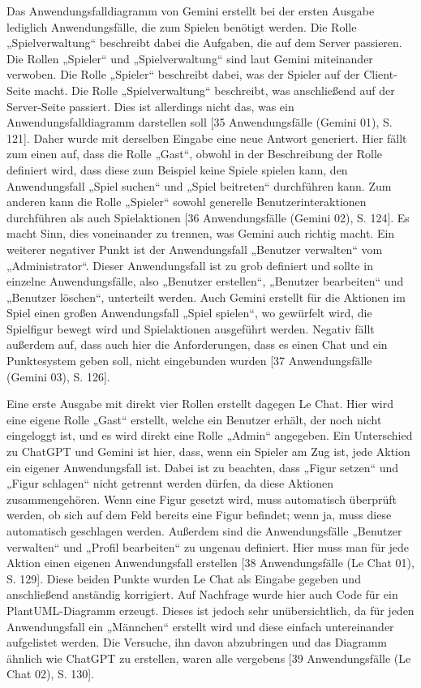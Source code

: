 Das Anwendungsfalldiagramm von Gemini erstellt bei der ersten Ausgabe lediglich Anwendungsfälle, die zum Spielen benötigt werden. Die Rolle 
„Spielverwaltung“ beschreibt dabei die Aufgaben, die auf dem Server passieren. Die Rollen „Spieler“ und „Spielverwaltung“ sind laut Gemini 
miteinander verwoben. Die Rolle „Spieler“ beschreibt dabei, was der Spieler auf der Client-Seite macht. Die Rolle „Spielverwaltung“ beschreibt, 
was anschließend auf der Server-Seite passiert. Dies ist allerdings nicht das, was ein Anwendungsfalldiagramm darstellen soll 
[35 Anwendungsfälle (Gemini 01), S. 121]. Daher wurde mit derselben Eingabe eine neue Antwort generiert. Hier fällt zum einen auf, dass die Rolle 
„Gast“, obwohl in der Beschreibung der Rolle definiert wird, dass diese zum Beispiel keine Spiele spielen kann, den Anwendungsfall „Spiel suchen“ 
und „Spiel beitreten“ durchführen kann. Zum anderen kann die Rolle „Spieler“ sowohl generelle Benutzerinteraktionen durchführen als auch 
Spielaktionen [36 Anwendungsfälle (Gemini 02), S. 124]. Es macht Sinn, dies voneinander zu trennen, was Gemini auch richtig macht. Ein weiterer 
negativer Punkt ist der Anwendungsfall „Benutzer verwalten“ vom „Administrator“. Dieser Anwendungsfall ist zu grob definiert und sollte in einzelne 
Anwendungsfälle, also „Benutzer erstellen“, „Benutzer bearbeiten“ und „Benutzer löschen“, unterteilt werden. Auch Gemini erstellt für die Aktionen 
im Spiel einen großen Anwendungsfall „Spiel spielen“, wo gewürfelt wird, die Spielfigur bewegt wird und Spielaktionen ausgeführt werden. Negativ 
fällt außerdem auf, dass auch hier die Anforderungen, dass es einen Chat und ein Punktesystem geben soll, nicht eingebunden wurden 
[37 Anwendungsfälle (Gemini 03), S. 126].

Eine erste Ausgabe mit direkt vier Rollen erstellt dagegen Le Chat. Hier wird eine eigene Rolle „Gast“ erstellt, welche ein Benutzer 
erhält, der noch nicht eingeloggt ist, und es wird direkt eine Rolle „Admin“ angegeben. Ein Unterschied zu ChatGPT und Gemini ist hier, 
dass, wenn ein Spieler am Zug ist, jede Aktion ein eigener Anwendungsfall ist. Dabei ist zu beachten, dass „Figur setzen“ und 
„Figur schlagen“ nicht getrennt werden dürfen, da diese Aktionen zusammengehören. Wenn eine Figur gesetzt wird, muss automatisch überprüft 
werden, ob sich auf dem Feld bereits eine Figur befindet; wenn ja, muss diese automatisch geschlagen werden. Außerdem sind die Anwendungsfälle 
„Benutzer verwalten“ und „Profil bearbeiten“ zu ungenau definiert. Hier muss man für jede Aktion einen eigenen Anwendungsfall erstellen 
[38 Anwendungsfälle (Le Chat 01), S. 129]. Diese beiden Punkte wurden Le Chat als Eingabe gegeben und anschließend anständig korrigiert. 
Auf Nachfrage wurde hier auch Code für ein PlantUML-Diagramm erzeugt. Dieses ist jedoch sehr unübersichtlich, da für jeden Anwendungsfall 
ein „Männchen“ erstellt wird und diese einfach untereinander aufgelistet werden. Die Versuche, ihn davon abzubringen und das Diagramm ähnlich 
wie ChatGPT zu erstellen, waren alle vergebens [39 Anwendungsfälle (Le Chat 02), S. 130].

